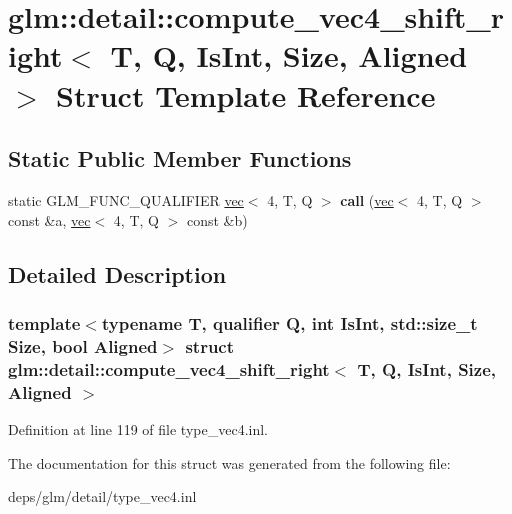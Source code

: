 \hypertarget{structglm_1_1detail_1_1compute__vec4__shift__right}{}\section{glm\+:\+:detail\+:\+:compute\+\_\+vec4\+\_\+shift\+\_\+right$<$ T, Q, Is\+Int, Size, Aligned $>$ Struct Template Reference}
\label{structglm_1_1detail_1_1compute__vec4__shift__right}
\subsection*{Static Public Member Functions}
\begin{DoxyCompactItemize}
\item 
\mbox{\label{structglm_1_1detail_1_1compute__vec4__shift__right_a8af4802653b2525d63fd1bc5fcd4f32e}} 
static G\+L\+M\+\_\+\+F\+U\+N\+C\+\_\+\+Q\+U\+A\+L\+I\+F\+I\+ER \hyperlink{structglm_1_1vec}{vec}$<$ 4, T, Q $>$ {\bfseries call} (\hyperlink{structglm_1_1vec}{vec}$<$ 4, T, Q $>$ const \&a, \hyperlink{structglm_1_1vec}{vec}$<$ 4, T, Q $>$ const \&b)
\end{DoxyCompactItemize}


\subsection{Detailed Description}
\subsubsection*{template$<$typename T, qualifier Q, int Is\+Int, std\+::size\+\_\+t Size, bool Aligned$>$\newline
struct glm\+::detail\+::compute\+\_\+vec4\+\_\+shift\+\_\+right$<$ T, Q, Is\+Int, Size, Aligned $>$}



Definition at line 119 of file type\+\_\+vec4.\+inl.



The documentation for this struct was generated from the following file\+:\begin{DoxyCompactItemize}
\item 
deps/glm/detail/type\+\_\+vec4.\+inl\end{DoxyCompactItemize}
